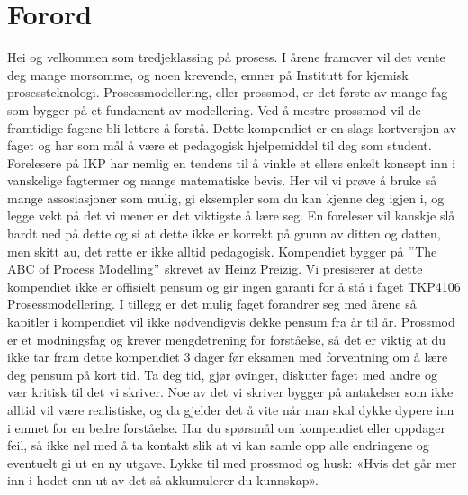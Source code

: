 \section{Forord}\label{sec:forord} 
Hei og velkommen som tredjeklassing på prosess. I årene framover vil det vente deg mange morsomme, og noen krevende, emner på Institutt for kjemisk prosessteknologi. Prosessmodellering, eller prossmod, er det første av mange fag som bygger på et fundament av modellering. Ved å mestre prossmod vil de framtidige fagene bli lettere å forstå. Dette kompendiet er en slags kortversjon av faget og har som mål å være et pedagogisk hjelpemiddel til deg som student. Forelesere på IKP har nemlig en tendens til å vinkle et ellers enkelt konsept inn i vanskelige fagtermer og mange matematiske bevis. Her vil vi prøve å bruke så mange assosiasjoner som mulig, gi eksempler som du kan kjenne deg igjen i, og legge vekt på det vi mener er det viktigste å lære seg. En foreleser vil kanskje slå hardt ned på dette og si at dette ikke er korrekt på grunn av ditten og datten, men skitt au, det rette er ikke alltid pedagogisk. Kompendiet bygger på $"$The ABC of Process Modelling$"$ skrevet av Heinz Preizig. Vi presiserer at dette kompendiet ikke er offisielt pensum og gir ingen garanti for å stå i faget TKP4106 Prosessmodellering. I tillegg er det mulig faget forandrer seg med årene så kapitler i kompendiet vil ikke nødvendigvis dekke pensum fra år til år. Prossmod er et modningsfag og krever mengdetrening for forståelse, så det er viktig at du ikke tar fram dette kompendiet 3 dager før eksamen med forventning om å lære deg pensum på kort tid. Ta deg tid, gjør øvinger, diskuter faget med andre og vær kritisk til det vi skriver. Noe av det vi skriver bygger på antakelser som ikke alltid vil være realistiske, og da gjelder det å vite når man skal dykke dypere inn i emnet for en bedre forståelse. Har du spørsmål om kompendiet eller oppdager feil, så ikke nøl med å ta kontakt slik at vi kan samle opp alle endringene og eventuelt gi ut en ny utgave. Lykke til med prossmod og husk: «Hvis det går mer inn i hodet enn ut av det så akkumulerer du kunnskap». 

\setcounter{page}{1}
\clearpage
